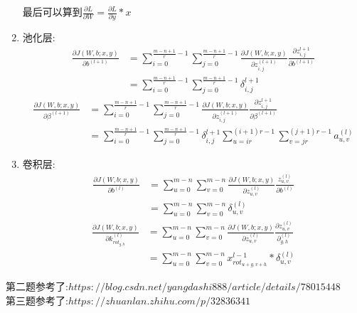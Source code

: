 \documentclass[11pt, a4paper, UTF8]{ctexart}
\begin{document}
\begin{solution}
\begin{enumerate}
最后可以算到$\frac{\partial L}{\partial W}=\frac{\partial L}{\partial y}*x$
\item 池化层:
\begin{equation}
\begin{aligned}
\frac{\partial J(W,b;x,y)}{\partial b^{(l+1)}}&=\sum _{i=0}^{\frac{m-n+1}{r}-1}\sum^{\frac{m-n+1}{r}-1}_{j=0}\frac{\partial J(W,b;x,y)}{\partial z_{i,j}^{(l+1)}}\frac{\partial z_{i,j}^{l+1}}{\partial b^{(l+1)}}\\&=\sum _{i=0}^{\frac{m-n+1}{r}-1}\sum^{\frac{m-n+1}{r}-1}_{j=0}\delta _{i,j}^{l+1}
\end{aligned}
\end{equation}
\begin{equation}
\begin{aligned}
\frac{\partial J(W,b;x,y)}{\partial \beta^{(l+1)}}&=\sum _{i=0}^{\frac{m-n+1}{r}-1}\sum^{\frac{m-n+1}{r}-1}_{j=0}\frac{\partial J(W,b;x,y)}{\partial z_{i,j}^{(l+1)}}\frac{\partial z_{i,j}^{l+1}}{\partial \beta ^{(l+1)}}\\&=\sum _{i=0}^{\frac{m-n+1}{r}-1}\sum^{\frac{m-n+1}{r}-1}_{j=0}\delta _{i,j}^{l+1}\sum ^{(i+1)r-1}_{u=ir}\sum^{(j+1)r-1}_{v=jr}a_{u,v}^{(l)}
\end{aligned}
\end{equation}
\item 卷积层:
\begin{equation}
\begin{aligned}
\frac{\partial J(W,b;x,y)}{\partial b^{(l)}}&=\sum _{u=0}^{m-n} \sum _{v=0}^{m-n}\frac{\partial J(W,b;x,y)}{\partial z_{u,v}^{(l)}}\frac{z_{u,v}^{(l)}}{\partial b^{(l)}}\\&=\sum _{u=0}^{m-n} \sum _{v=0}^{m-n}\delta _{u,v}^{(l)}
\end{aligned}
\end{equation}
\begin{equation}
\begin{aligned}
\frac{\partial J(W,b;x,y)}{\partial k_{rot_{g,h}}^{(l)}}&=\sum _{u=0}^{m-n} \sum _{v=0}^{m-n}\frac{\partial J(W,b;x,y)}{\partial z_{u,v}^{(l)}}\frac{\partial z_{u,v}^{(l)}}{\partial _{g,h}^{(l)}}\\&=\sum _{u=0}^{m-n} \sum _{v=0}^{m-n}x_{rot_{u+g,v+h}}^{l-1}*\delta_{u,v}^{(l)}
\end{aligned}
\end{equation}
	\end{enumerate}
\end{solution}
\begin{remark}
	第二题参考了:$https://blog.csdn.net/yangdashi888/article/details/78015448$\\
	第三题参考了:$https://zhuanlan.zhihu.com/p/32836341$
	
	
\end{remark}
\end{document}
